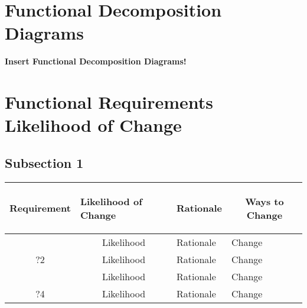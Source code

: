 \documentclass [11pt]{article}
\begin{document}
\section{Functional Decomposition Diagrams}
\textbf{Insert Functional Decomposition Diagrams!}
%	
%
%
%	



\section{Functional Requirements Likelihood of Change} 

\subsection{Subsection 1}

\begin{longtable}{| p{ } | p{ } |  p{ } | p{ } |}\hline 
\multicolumn{1}{|c|}{\textbf {Requirement}} & 
\begin{minipage}{.14 \columnwidth}\begin{center}\vspace{1.5mm}\textbf{Likelihood of Change}   \vspace{1.5mm} \end{center}\end{minipage}& 
\multicolumn{1}{c|}{\textbf {Rationale}} & \multicolumn{1}{c|}{\textbf {Ways to Change}} \\ \hline

\rowcolor{tableCell} \multicolumn{1}{|c|}{?1}& 
\multicolumn{1}{|c|}{Likelihood} & Rationale & Change \\ \hline

\multicolumn{1}{|c|}{?2}& 
\multicolumn{1}{|c|}{Likelihood} & Rationale & Change \\ \hline

\rowcolor{tableCell} \multicolumn{1}{|c|}{?3}& 
\multicolumn{1}{|c|}{Likelihood} & Rationale & Change \\ \hline

\multicolumn{1}{|c|}{?4}& 
\multicolumn{1}{|c|}{Likelihood} & Rationale & Change \\ \hline
\end{longtable}
\end{document}
